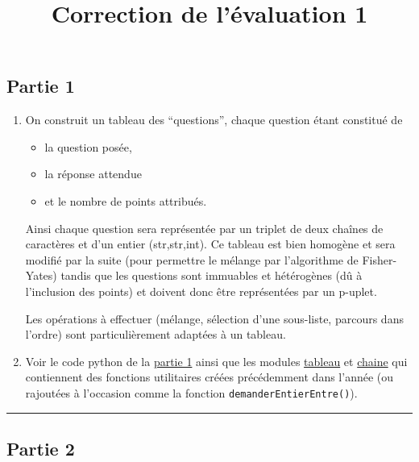 \documentclass[french]{scrartcl}
\title{Correction de l'évaluation 1}
\author{}
\date{}
\providecommand{\tightlist}{%
  \setlength{\itemsep}{0pt}\setlength{\parskip}{0pt}}
\begin{document}
\maketitle

\hypertarget{partie-1}{%
\subsection{Partie 1}\label{partie-1}}

\begin{enumerate}
\def\labelenumi{\arabic{enumi}.}
\item
  On construit un tableau des ``questions'', chaque question étant
  constitué de

  \begin{itemize}
  \tightlist
  \item
    la question posée,
  \item
    la réponse attendue
  \item
    et le nombre de points attribués.
  \end{itemize}

  Ainsi chaque question sera représentée par un triplet de deux chaînes
  de caractères et d'un entier (str,str,int). Ce tableau est bien
  homogène et sera modifié par la suite (pour permettre le mélange par
  l'algorithme de Fisher-Yates) tandis que les questions sont immuables
  et hétérogènes (dû à l'inclusion des points) et doivent donc être
  représentées par un p-uplet.

  Les opérations à effectuer (mélange, sélection d'une sous-liste,
  parcours dans l'ordre) sont particulièrement adaptées à un tableau.
\item
  Voir le code python de la \href{partie1.py}{partie 1} ainsi que les
  modules \href{tableau.py}{tableau} et \href{chaine.py}{chaine} qui
  contiennent des fonctions utilitaires créées précédemment dans l'année
  (ou rajoutées à l'occasion comme la fonction
  \texttt{demanderEntierEntre()}).
\end{enumerate}

\begin{center}\rule{0.5\linewidth}{0.5pt}\end{center}

\hypertarget{partie-2}{%
\subsection{Partie 2}\label{partie-2}}
\end{document}
